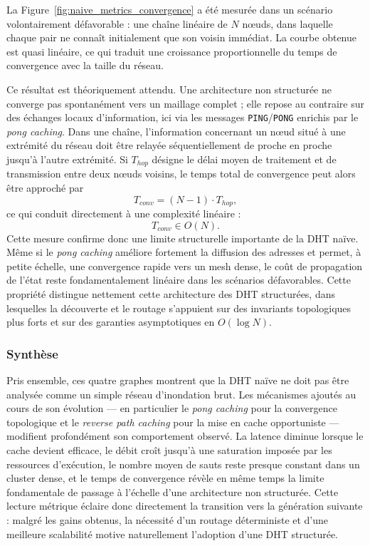 La Figure~\ref{fig:naive_metrics_convergence} a été mesurée dans un scénario volontairement défavorable : une chaîne linéaire de \(N\) n\oe uds, dans laquelle chaque pair ne connaît initialement que son voisin immédiat. La courbe obtenue est quasi linéaire, ce qui traduit une croissance proportionnelle du temps de convergence avec la taille du réseau.

Ce résultat est théoriquement attendu. Une architecture non structurée ne converge pas spontanément vers un maillage complet ; elle repose au contraire sur des échanges locaux d'information, ici via les messages \texttt{PING}/\texttt{PONG} enrichis par le \textit{pong caching}. Dans une chaîne, l'information concernant un n\oe ud situé à une extrémité du réseau doit être relayée séquentiellement de proche en proche jusqu'à l'autre extrémité. Si \(T_{hop}\) désigne le délai moyen de traitement et de transmission entre deux n\oe uds voisins, le temps total de convergence peut alors être approché par
\[
T_{conv} = (N-1) \cdot T_{hop},
\]
ce qui conduit directement à une complexité linéaire :
\[
T_{conv} \in O(N).
\]
Cette mesure confirme donc une limite structurelle importante de la DHT naïve. Même si le \textit{pong caching} améliore fortement la diffusion des adresses et permet, à petite échelle, une convergence rapide vers un mesh dense, le coût de propagation de l'état reste fondamentalement linéaire dans les scénarios défavorables. Cette propriété distingue nettement cette architecture des DHT structurées, dans lesquelles la découverte et le routage s'appuient sur des invariants topologiques plus forts et sur des garanties asymptotiques en \(O(\log N)\).

\subsubsection{Synthèse}

Pris ensemble, ces quatre graphes montrent que la DHT naïve ne doit pas être analysée comme un simple réseau d'inondation brut. Les mécanismes ajoutés au cours de son évolution --- en particulier le \textit{pong caching} pour la convergence topologique et le \textit{reverse path caching} pour la mise en cache opportuniste --- modifient profondément son comportement observé. La latence diminue lorsque le cache devient efficace, le débit croît jusqu'à une saturation imposée par les ressources d'exécution, le nombre moyen de sauts reste presque constant dans un cluster dense, et le temps de convergence révèle en même temps la limite fondamentale de passage à l'échelle d'une architecture non structurée. Cette lecture métrique éclaire donc directement la transition vers la génération suivante : malgré les gains obtenus, la nécessité d'un routage déterministe et d'une meilleure scalabilité motive naturellement l'adoption d'une DHT structurée.


